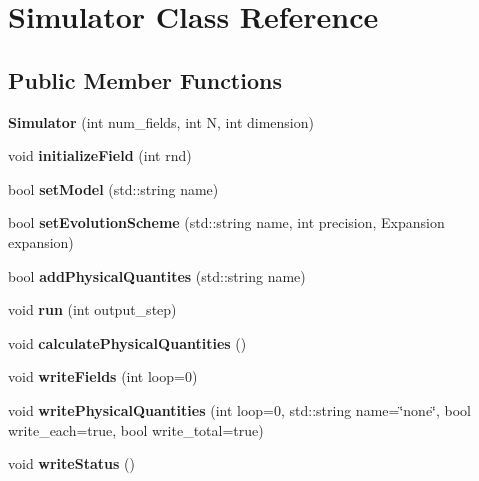 \hypertarget{class_simulator}{}\section{Simulator Class Reference}
\label{class_simulator}
\subsection*{Public Member Functions}
\begin{DoxyCompactItemize}
\item 
\mbox{\label{class_simulator_a21599e1d1087379526018461865edc76}} 
{\bfseries Simulator} (int num\+\_\+fields, int N, int dimension)
\item 
\mbox{\label{class_simulator_a124ec3d47704e6df2bcc575430ca1327}} 
void {\bfseries initialize\+Field} (int rnd)
\item 
\mbox{\label{class_simulator_ab164215c1cca5a19b90970e2dd36e09a}} 
bool {\bfseries set\+Model} (std\+::string name)
\item 
\mbox{\label{class_simulator_a3344e15e02b5d90e9800212bbb417aed}} 
bool {\bfseries set\+Evolution\+Scheme} (std\+::string name, int precision, Expansion expansion)
\item 
\mbox{\label{class_simulator_a331af9b2a231d76a90db87566664152c}} 
bool {\bfseries add\+Physical\+Quantites} (std\+::string name)
\item 
\mbox{\label{class_simulator_a3b1608831b3a559424d0af5b7fd789be}} 
void {\bfseries run} (int output\+\_\+step)
\item 
\mbox{\label{class_simulator_a5fc3f2c9ce8099b27b7744274416d5a8}} 
void {\bfseries calculate\+Physical\+Quantities} ()
\item 
\mbox{\label{class_simulator_a94c638929256df21ca9baa784985007f}} 
void {\bfseries write\+Fields} (int loop=0)
\item 
\mbox{\label{class_simulator_a944c5c9229e603c8da2737511b6557ba}} 
void {\bfseries write\+Physical\+Quantities} (int loop=0, std\+::string name=\char`\"{}none\char`\"{}, bool write\+\_\+each=true, bool write\+\_\+total=true)
\item 
\mbox{\label{class_simulator_aef37b00f4a9d739a03004b3b0a083d4a}} 
void {\bfseries write\+Status} ()
\end{DoxyCompactItemize}

